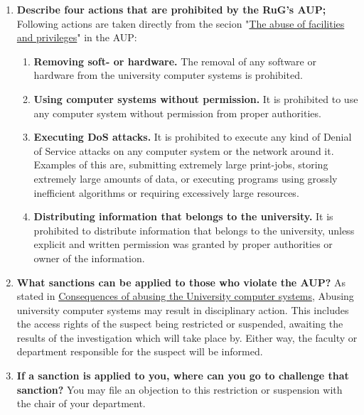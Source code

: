 \documentclass{report}
\begin{document}
\begin{enumerate}
      \item \textbf{Describe four actions that are prohibited by the RuG's AUP;}
            Following actions are taken directly from the secion
            "\href{
                  https://www.rug.nl/society-business/centre-for-information-technology/security/aup/#:~:text=The%
            }{The abuse of facilities and privileges}"
            in the AUP:
            \begin{enumerate}
                  \item \textbf{Removing soft- or hardware.}
                        The removal of any software or hardware from the university computer systems is prohibited.
                  \item \textbf{Using computer systems without permission.}
                        It is prohibited to use any computer system without permission from proper authorities.
                  \item \textbf{Executing DoS attacks.}
                        It is prohibited to execute any kind of Denial of Service attacks on any computer system
                        or the network around it. Examples of this are, submitting extremely large print-jobs,
                        storing extremely large amounts of data, or executing programs using grossly inefficient algorithms
                        or requiring excessively large resources.
                  \item \textbf{Distributing information that belongs to the university.}
                        It is prohibited to distribute information that belongs to the university,
                        unless explicit and written permission was granted by proper authorities or owner of the information.
            \end{enumerate}

      \item \textbf{What sanctions can be applied to those who violate the AUP?}
            As stated in
            \href{
                  https://www.rug.nl/society-business/centre-for-information-technology/security/aup/#:~:text=Consequences%
            }{Consequences of abusing the University computer systems},
            Abusing university computer systems may result in disciplinary action.
            This includes the access rights of the suspect being restricted or suspended,
            awaiting the results of the investigation which will take place by. Either way,
            the faculty or department responsible for the suspect will be informed.

      \item \textbf{If a sanction is applied to you, where can you go to challenge that sanction?}
            You may file an objection to this restriction or suspension with the chair of your department.

\end{enumerate}
\end{document}
